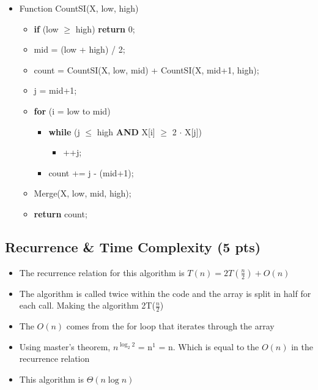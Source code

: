 \documentclass{article}[12pt]
\begin{document}
\begin{itemize}
  \item Function CountSI(X, low, high)
    \begin{itemize}
      \item \textbf{if} (low $\geq$ high) \textbf{return} 0;
      \item mid = (low + high) / 2;
      \item count = CountSI(X, low, mid) + CountSI(X, mid+1, high);
      \item j = mid+1;
      \item \textbf{for} (i = low to mid)
        \begin{itemize}
          \item \textbf{while} (j $\leq$ high \textbf{AND} X[i] $\geq$ 2 $\cdot$ X[j])
        \begin{itemize}
          \item ++j;
        \end{itemize}
          \item count += j - (mid+1);
        \end{itemize}
      \item Merge(X, low, mid, high);
      \item \textbf{return} count;
\end{itemize}
\end{itemize}

\vspace*{10px}
\subsection{Recurrence \& Time Complexity (5 pts)}
\begin{itemize}
  \item The recurrence relation for this algorithm is $T(n) = 2T(\frac{n}{2}) + O(n)$
  \item The algorithm is called twice within the code and the 
    array is split in half for each call. Making the algorithm 
    2T($\frac{n}{2}$)
  \item The $O(n)$ comes from the for loop that iterates through the array
  \item Using master's theorem,
    $n^{\log_{2} 2}$ = n$^{1}$ = n.
    Which is equal to the $O(n)$ in the recurrence relation
  \item This algorithm is $\Theta(n \log n)$
\end{itemize}
\end{document}
